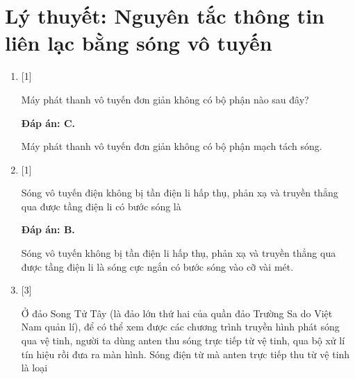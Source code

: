 \section{Lý thuyết: Nguyên tắc thông tin liên lạc bằng sóng vô tuyến}
\begin{enumerate}[label=\bfseries Câu \arabic*:]

	\item {} [1]
	
	\cauhoi
	{Máy phát thanh vô tuyến đơn giản không có bộ phận nào sau đây?
	}
	
	\loigiai
	{		\textbf{Đáp án: C.}
		
Máy phát thanh vô tuyến đơn giản không có bộ phận mạch tách sóng.
	} 
	
	\item {} [1]
	
	\cauhoi
	{Sóng vô tuyến điện không bị tần điện li hấp thụ, phản xạ và truyền thẳng qua được tầng điện li có bước sóng là
	}
	
	\loigiai
	{		\textbf{Đáp án: B.}
		
Sóng vô tuyến không bị tần điện li hấp thụ, phản xạ và truyền thẳng qua được tầng điện li là sóng cực ngắn có bước sóng vào cỡ vài mét.
		
	}

	\item {} [3]
	
	\cauhoi
	{Ở đảo Song Tử Tây (là đảo lớn thứ hai của quần đảo Trường Sa do Việt Nam quản lí), để có thể xem được các chương trình truyền hình phát sóng qua vệ tinh, người ta dùng anten thu sóng trực tiếp từ vệ tinh, qua bộ xử lí tín hiệu rồi đưa ra màn hình. Sóng điện từ mà anten trực tiếp thu từ vệ tinh là loại 
	}
	

\end{enumerate}
